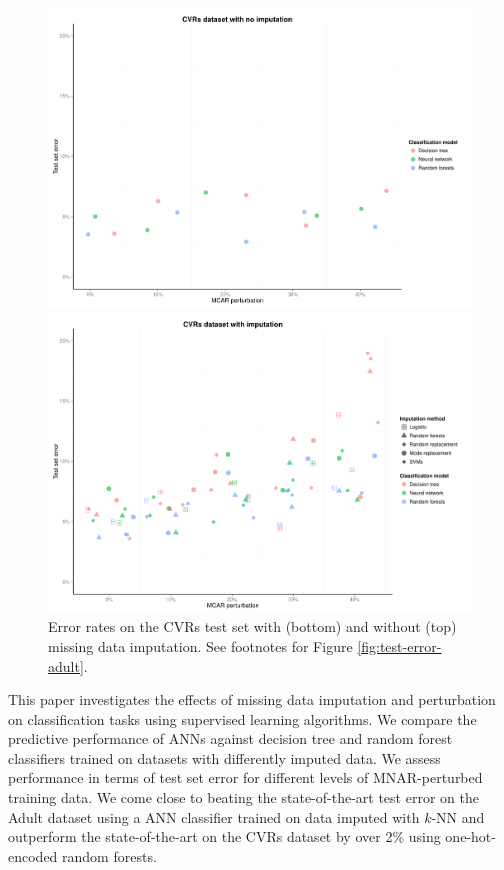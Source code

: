 \documentclass[10pt]{book}
\theoremstyle{definition}
\begin{document}
\begin{figure}[h!]
\includegraphics[scale=0.6, center]{figure/test-errors-votes-no-imp-mcar}\par
\includegraphics[scale=0.6, center]{figure/test-errors-votes-imp-mcar}\par
   \caption{\footnotesize Error rates on the CVRs test set with (bottom) and without (top) missing data imputation. See footnotes for Figure \ref{fig:test-error-adult}.}
   \label{fig:test-error-votes}
\end{figure}

\par

\setcounter{chapter}{4}
\setcounter{equation}{0} %

This paper investigates the effects of missing data imputation and perturbation on classification tasks using supervised learning algorithms. We compare the predictive performance of ANNs against decision tree and random forest classifiers trained on datasets with differently imputed data. We assess performance in terms of test set error for different levels of MNAR-perturbed training data. We come close to beating the state-of-the-art test error on the Adult dataset using a ANN classifier trained on data imputed with $k$-NN  and outperform the state-of-the-art on the CVRs dataset by over 2\% using one-hot-encoded random forests. 
\end{document}
